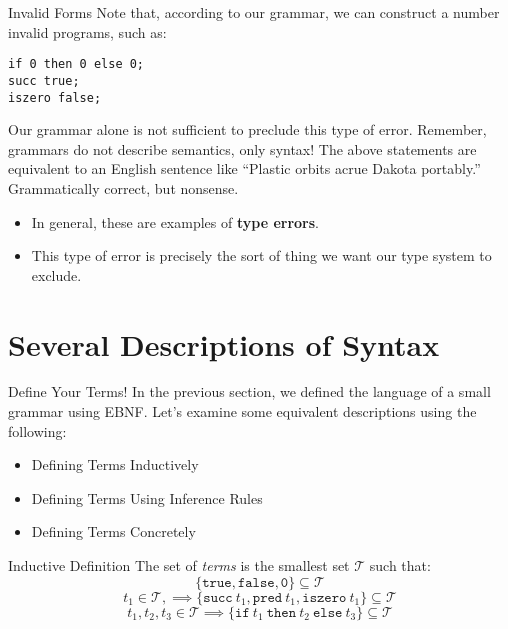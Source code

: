 \documentclass[11pt]{beamer}
\begin{document}
\begin{frame}[fragile=singleslide]{Invalid Forms}
Note that, according to our grammar, we can construct a number invalid programs, such as:

\begin{lstlisting}[style=C]
if 0 then 0 else 0;
succ true;
iszero false;
\end{lstlisting}
Our grammar alone is not sufficient to preclude this type of error.  Remember, grammars do not  describe semantics, only syntax! The above statements are equivalent to an English sentence like ``Plastic orbits acrue Dakota portably.''  Grammatically correct, but nonsense.  
\begin{itemize}
\item In general, these are examples of \textbf{type errors}.
\item This type of error is precisely the sort of thing we want our type system to exclude.
\end{itemize}
\end{frame}

\section[Syntax]{Several Descriptions of Syntax}
\begin{frame}[fragile=singleslide]{Define Your Terms!}
In the previous section, we defined the language of a small grammar using EBNF.  Let's examine some equivalent descriptions using the following:
\begin{itemize}
\item Defining Terms Inductively
\item Defining Terms Using Inference Rules
\item Defining Terms Concretely
\end{itemize}
\end{frame}

\begin{frame}[fragile=singleslide]{Inductive Definition}
The set of \emph{terms} is the smallest set $\mathcal{T}$ such that:
\begin{equation}
\{\texttt{true}, \texttt{false}, \texttt{0}\} \subseteq \mathcal{T}
\end{equation}
\begin{equation}
t_1 \in \mathcal{T}, \implies \{\texttt{succ}\: t_1, \texttt{pred}\: t_1, \texttt{iszero}\: t_1\} \subseteq \mathcal{T}
\end{equation}
\begin{equation}
t_1, t_2, t_3 \in \mathcal{T} \implies \{ \texttt{if}\: t_1 \:\texttt{then}\: t_2 \:\texttt{else}\: t_3\} \subseteq \mathcal{T}
\end{equation}
\end{frame}
\end{document}
